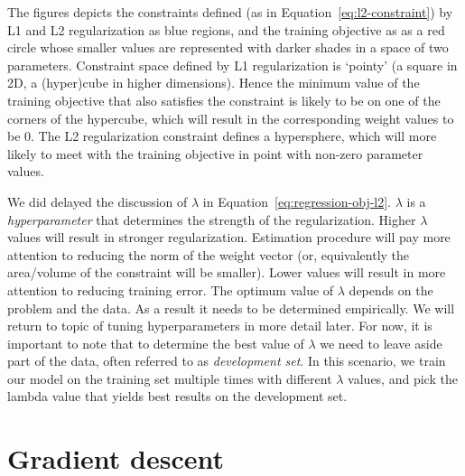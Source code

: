 \begin{marginfigure}[-5cm]
  \caption{\label{fig:l1-l2}%
    Visualization of L1 and L2 regularization.
  }
\end{marginfigure}
The figures depicts the constraints defined
(as in Equation~\ref{eq:l2-constraint}) by L1 and L2 regularization
as blue regions,
and the training objective as as a red circle whose smaller values
are represented with darker shades
in a space of two parameters.
Constraint space defined by L1 regularization is `pointy'
(a square in 2D, a (hyper)cube in higher dimensions).
Hence the minimum value of the training objective
that also satisfies the constraint is likely to be on one of the
corners of the hypercube, which will result in the corresponding
weight values to be \num{0}.
The L2 regularization constraint defines a hypersphere,
which will more likely to meet with the training objective
in point with non-zero parameter values.

We did delayed the discussion of $\lambda$ in 
Equation~\ref{eq:regression-obj-l2}.
$\lambda$ is a \emph{hyperparameter} that determines
the strength of the regularization.
Higher $\lambda$ values will result in stronger regularization.
Estimation procedure will pay more attention to reducing
the norm of the weight vector
(or, equivalently the area/volume of the constraint will be smaller).
Lower values will result in more attention to reducing training error.
The optimum value of $\lambda$ depends on the problem and the data.
As a result it needs to be determined empirically.
We will return to topic of tuning hyperparameters in more detail later.
For now, it is important to note that to determine the best
value of $\lambda$ we need to leave aside part of the data,
often referred to as \emph{development set}. 
In this scenario, we train our model on the training set multiple times
with different $\lambda$ values,
and pick the lambda value that yields best results on the development set.

\section{Gradient descent}

